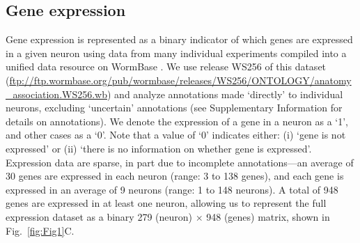 \documentclass[10pt,letterpaper]{article}
\begin{document}
\subsection*{Gene expression}
Gene expression is represented as a binary indicator of which genes are expressed in a given neuron using data from many individual experiments compiled into a unified data resource on WormBase \cite{Harris:2009kd}.
We use release WS256 of this dataset (\url{ftp://ftp.wormbase.org/pub/wormbase/releases/WS256/ONTOLOGY/anatomy_association.WS256.wb}) and analyze annotations made `directly' to individual neurons, excluding `uncertain' annotations (see Supplementary Information for details on annotations).
We denote the expression of a gene in a neuron as a `1', and other cases as a `0'.
Note that a value of `0' indicates either:
(i) `gene is not expressed' or
(ii) `there is no information on whether gene is expressed'.
Expression data are sparse, in part due to incomplete annotations---an average of 30 genes are expressed in each neuron (range: 3 to 138 genes), and each gene is expressed in an average of 9 neurons (range: 1 to 148 neurons).
A total of 948 genes are expressed in at least one neuron, allowing us to represent the full expression dataset as a binary 279 (neuron) $\times$ 948 (genes) matrix, shown in Fig.~\ref{fig:Fig1}C.
\end{document}
